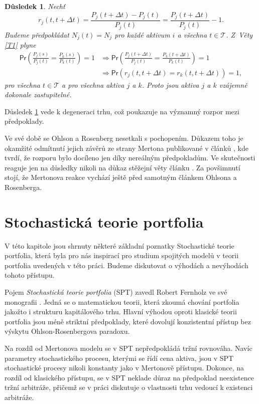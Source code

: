\documentclass[a4paper,12pt]{report}
\newtheorem{dusledek}[veta]{Důsledek}
\theoremstyle{definition} \newtheorem{definice}[veta]{Definice}
\theoremstyle{remark}
\begin{document}
\begin{dusledek}\label{OR_dusledek}
Nechť 
$$r_j(t,t+\Delta t)=\frac{P_j(t+\Delta t)-P_j(t)}{P_j(t)}=\frac{P_j(t+\Delta t)}{P_j(t)}-1.$$
Budeme předpokládat $N_j(t)=N_j$ pro každé aktivum $i$ a všechna $t\in \mathcal{T}$. 
Z~Věty \ref{T1} plyne
\begin{align*}
\mathsf{Pr}\left(\frac{P_j(s)}{P_j(t)}=\frac{P_k(s)}{P_k(t)}\right)=1&\Longrightarrow\mathsf{Pr}\left(\frac{P_j(t+\Delta t)}{P_j(t)}=\frac{P_k(t+\Delta t)}{P_k(t)}\right)=1 \\
&\Longrightarrow\mathsf{Pr}\left(r_j(t,t+\Delta t)=r_k(t,t+\Delta t)\right)=1,
\end{align*}
pro všechna $t\in \mathcal{T}$ a pro všechna aktiva $j$ a $k$.
Proto jsou aktiva $j$ a $k$ vzájemně dokonale zastupitelné.
\end{dusledek}
Důsledek \ref{OR_dusledek} vede k degeneraci trhu, což poukazuje na významný rozpor mezi předpoklady.

Ve své době se Ohlson a Rosenberg nesetkali s pochopením.
Důkazem toho je okamžité odmítnutí jejich závěrů ze strany Mertona publikované v článků \cite{merton1975}, kde tvrdí, že rozporu bylo docíleno jen díky nereálným předpokladům. 
Ve skutečnosti reaguje jen na důsledky nikoli na důkaz stěžejní věty článku \cite{ohlson}.  
Za povšimnutí stojí, že Mertonova reakce vychází ještě před samotným článkem Ohlsona a Rosenberga.


\section{Stochastická teorie portfolia}
V této kapitole jsou shrnuty některé základní poznatky Stochastické teorie portfolia, která byla pro nás inspirací pro studium spojitých modelů v teorii portfolia uvedených v této práci.
Budeme diskutovat o výhodách a nevýhodách tohoto přístupu.

Pojem \textit{Stochastická teorie portfolia} (SPT) zavedl Robert Fernholz ve své monografii \cite{fern}.
Jedná se o matematickou teorii, která zkoumá chování portfolia jakožto i strukturu kapitálového trhu.
Hlavní výhodou oproti klasické teorii portfolia jsou méně  striktní předpoklady, které dovolují konzistentní přístup bez výskytu Ohlson-Rosenbergova paradoxu.

Na rozdíl od Mertonova modelu se v SPT nepředpokládá tržní rovnováha.
Navíc parametry stochastického procesu, kterými se řídí cena aktiva, jsou v SPT stochastické procesy nikoli konstanty jako v Mertonově přístupu.
Dokonce, na rozdíl od klasického přístupu, se v SPT neklade důraz na předpoklad neexistence tržní arbitráže, přičemž se v práci diskutuje o vlastnosti trhu vedoucí k existenci arbitráže. 
\end{document}
